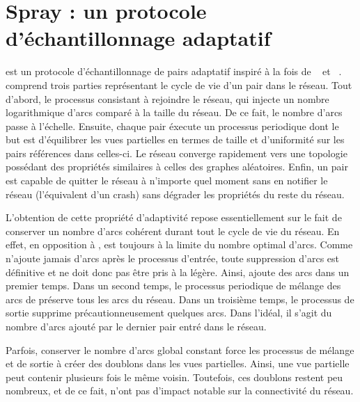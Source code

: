 
\chapter{Spray : un protocole d'échantillonnage adaptatif}
\label{net:chap:spray}
\minitoc

\SPRAY est un protocole d'échantillonnage de pairs adaptatif inspiré à la fois
de \SCAMP~\cite{ganesh2003peer} et \CYCLON~\cite{voulgaris2005cyclon}. \SPRAY
comprend trois parties représentant le cycle de vie d'un pair dans le
réseau. Tout d'abord, le processus consistant à rejoindre le réseau, qui injecte
un nombre logarithmique d'arcs comparé à la taille du réseau. De ce fait, le
nombre d'arcs passe à l'échelle. Ensuite, chaque pair éxecute un processus
periodique dont le but est d'équilibrer les vues partielles en termes de taille
et d'uniformité sur les pairs références dans celles-ci. Le réseau converge
rapidement vers une topologie possédant des propriétés similaires à celles des
graphes aléatoires. Enfin, un pair est capable de quitter le réseau à n'importe
quel moment sans en notifier le réseau (l'équivalent d'un crash) sans dégrader
les propriétés du reste du réseau.

L'obtention de cette propriété d'adaptivité repose essentiellement sur le fait
de conserver un nombre d'arcs cohérent durant tout le cycle de vie du réseau.
En effet, en opposition à \CYCLON, \SPRAY est toujours à la limite du nombre
optimal d'arcs. Comme \SPRAY n'ajoute jamais d'arcs après le processus d'entrée,
toute suppression d'arcs est définitive et ne doit donc pas être pris à la
légère. Ainsi, \SPRAY ajoute des arcs dans un premier temps. Dans un second
temps, le processus periodique de mélange des arcs de \SPRAY préserve tous les
arcs du réseau.  Dans un troisième temps, le processus de sortie supprime
précautionneusement quelques arcs. Dans l'idéal, il s'agit du nombre d'arcs
ajouté par le dernier pair entré dans le réseau.

Parfois, conserver le nombre d'arcs global constant force les processus de
mélange et de sortie à créer des doublons dans les vues partielles. Ainsi, une
vue partielle peut contenir plusieurs fois le même voisin. Toutefois, ces
doublons restent peu nombreux, et de ce fait, n'ont pas d'impact notable sur la
connectivité du réseau.


